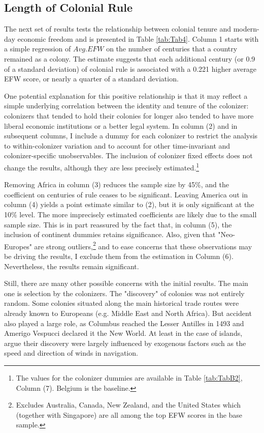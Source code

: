 \documentclass[a4paper,12pt]{article}
\begin{document}
\subsection{Length of Colonial Rule}

The next set of results tests the relationship between colonial tenure and modern-day economic freedom and is presented in Table \ref{tab:Tab4}. Column 1 starts with a simple regression of $Avg. EFW$ on the number of centuries that a country remained as a colony. The estimate suggests that each additional century (or 0.9 of a standard deviation) of colonial rule is associated with a 0.221 higher average EFW score, or nearly a quarter of a standard deviation. 

One potential explanation for this positive relationship is that it may reflect a simple underlying correlation between the identity and tenure of the colonizer: colonizers that tended to hold their colonies for longer also tended to have more liberal economic institutions or a better legal system. In column (2) and in subsequent columns, I include a dummy for each colonizer to restrict the analysis to within-colonizer variation and to account for other time-invariant and colonizer-specific unobservables. The inclusion of colonizer fixed effects does not change the results, although they are less precisely estimated.\footnote{The values for the colonizer dummies are available in Table \ref{tab:TabB2}, Column (7). Belgium is the baseline.}

Removing Africa in column (3) reduces the sample size by 45\%, and the coefficient on centuries of rule ceases to be significant. Leaving America out in column (4) yields a point estimate similar to (2), but it is only significant at the 10\% level. The more imprecisely estimated coefficients are likely due to the small sample size. This is in part reassured by the fact that, in column (5), the inclusion of continent dummies retains significance. Also, given that "Neo-Europes" are strong outliers,\footnote{Excludes Australia, Canada, New Zealand, and the United States which (together with Singapore) are all among the top EFW scores in the base sample.} and to ease concerns that these observations may be driving the results, I exclude them from the estimation in Column (6). Nevertheless, the results remain significant. 

Still, there are many other possible concerns with the initial results. The main one is selection by the colonizers. The "discovery" of colonies was not entirely random. Some colonies situated along the main historical trade routes were already known to Europeans (e.g. Middle East and North Africa). But accident also played a large role, as Columbus reached the Lesser Antilles in 1493 and Amerigo Vespucci declared it the New World. At least in the case of islands, \cite{feyrer2009colonialism} argue their discovery were largely influenced by exogenous factors such as the speed and direction of winds in navigation. 
\end{document}
